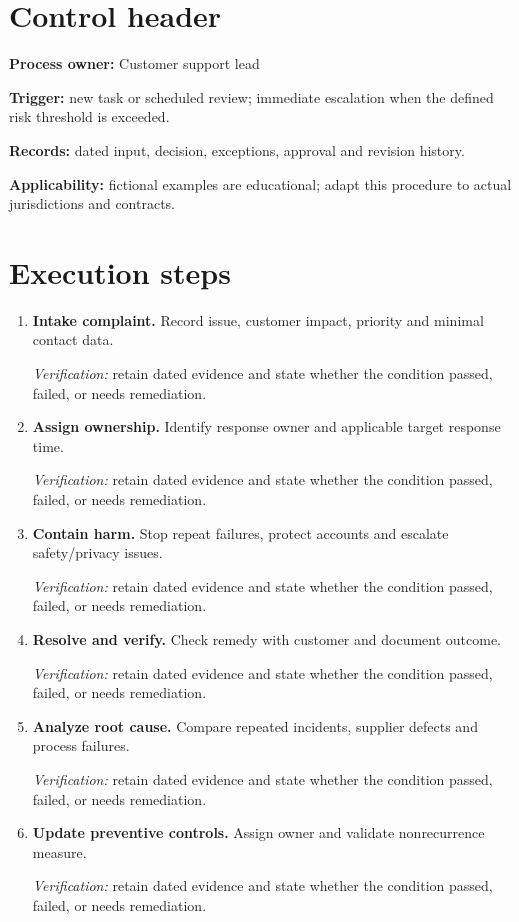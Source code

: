 \documentclass[11pt]{article}
\begin{document}
\SuiteOpen
\section{Control header}
\textbf{Process owner:} Customer support lead\par\textbf{Trigger:} new task or scheduled review; immediate escalation when the defined risk threshold is exceeded.\par\textbf{Records:} dated input, decision, exceptions, approval and revision history.\par\textbf{Applicability:} fictional examples are educational; adapt this procedure to actual jurisdictions and contracts.
\section{Execution steps}
\begin{enumerate}[leftmargin=*,itemsep=8pt]
\item \textbf{Intake complaint.} Record issue, customer impact, priority and minimal contact data.\par\textit{Verification:} retain dated evidence and state whether the condition passed, failed, or needs remediation.
\item \textbf{Assign ownership.} Identify response owner and applicable target response time.\par\textit{Verification:} retain dated evidence and state whether the condition passed, failed, or needs remediation.
\item \textbf{Contain harm.} Stop repeat failures, protect accounts and escalate safety/privacy issues.\par\textit{Verification:} retain dated evidence and state whether the condition passed, failed, or needs remediation.
\item \textbf{Resolve and verify.} Check remedy with customer and document outcome.\par\textit{Verification:} retain dated evidence and state whether the condition passed, failed, or needs remediation.
\item \textbf{Analyze root cause.} Compare repeated incidents, supplier defects and process failures.\par\textit{Verification:} retain dated evidence and state whether the condition passed, failed, or needs remediation.
\item \textbf{Update preventive controls.} Assign owner and validate nonrecurrence measure.\par\textit{Verification:} retain dated evidence and state whether the condition passed, failed, or needs remediation.
\end{enumerate}
\end{document}
